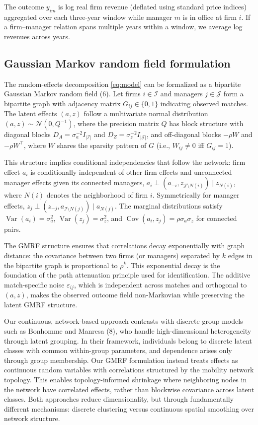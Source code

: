 \documentclass[9pt,twocolumn,twoside]{pnas-new}
\begin{document}
{The outcome $y_{im}$ is log real firm revenue (deflated using standard price indices) aggregated over each three-year window while manager $m$ is in office at firm $i$. If a firm--manager relation spans multiple years within a window, we average log revenues across years.

\subsection*{Gaussian Markov random field formulation}

The random-effects decomposition \eqref{eq:model} can be formalized as a bipartite Gaussian Markov random field (6). Let firms $i \in \mathcal{I}$ and managers $j \in \mathcal{J}$ form a bipartite graph with adjacency matrix $G_{ij} \in \{0,1\}$ indicating observed matches. The latent effects $(a,z)$ follow a multivariate normal distribution $(a,z) \sim \mathcal{N}(0, Q^{-1})$, where the precision matrix $Q$ has block structure with diagonal blocks $D_A = \sigma_a^{-2} I_{|\mathcal{I}|}$ and $D_Z = \sigma_z^{-2} I_{|\mathcal{J}|}$, and off-diagonal blocks $-\rho W$ and $-\rho W^\top$, where $W$ shares the sparsity pattern of $G$ (i.e., $W_{ij}\neq 0$ iff $G_{ij}=1$).

This structure implies conditional independencies that follow the network: firm effect $a_i$ is conditionally independent of other firm effects and unconnected manager effects given its connected managers, $a_i \perp (a_{-i}, z_{\mathcal{J}\setminus N(i)}) \mid z_{N(i)}$, where $N(i)$ denotes the neighborhood of firm $i$. Symmetrically for manager effects, $z_j \perp (z_{-j}, a_{\mathcal{I}\setminus N(j)}) \mid a_{N(j)}$. The marginal distributions satisfy $\operatorname{Var}(a_i)=\sigma_a^2$, $\operatorname{Var}(z_j)=\sigma_z^2$, and $\operatorname{Cov}(a_i,z_j)=\rho\sigma_a\sigma_z$ for connected pairs.

The GMRF structure ensures that correlations decay exponentially with graph distance: the covariance between two firms (or managers) separated by $k$ edges in the bipartite graph is proportional to $\rho^k$. This exponential decay is the foundation of the path attenuation principle used for identification. The additive match-specific noise $\varepsilon_{ij}$, which is independent across matches and orthogonal to $(a,z)$, makes the observed outcome field non-Markovian while preserving the latent GMRF structure.

Our continuous, network-based approach contrasts with discrete group models such as Bonhomme and Manresa (8), who handle high-dimensional heterogeneity through latent grouping. In their framework, individuals belong to discrete latent classes with common within-group parameters, and dependence arises only through group membership. Our GMRF formulation instead treats effects as continuous random variables with correlations structured by the mobility network topology. This enables topology-informed shrinkage where neighboring nodes in the network have correlated effects, rather than blockwise covariance across latent classes. Both approaches reduce dimensionality, but through fundamentally different mechanisms: discrete clustering versus continuous spatial smoothing over network structure.

}
\end{document}
